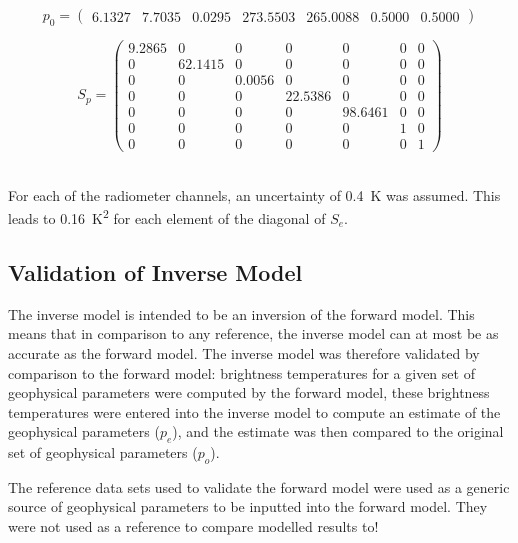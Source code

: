 \documentclass[11pt, a4paper]{article}
\begin{document}
\begin{equation*}
p_0 =
\begin{pmatrix}
   6.1327 & 7.7035 & 0.0295 & 273.5503 & 265.0088 & 0.5000 & 0.5000
\end{pmatrix}
\end{equation*}

\begin{equation*}
S_p =
\begin{pmatrix}
   9.2865 & 0 & 0 & 0 & 0 & 0 & 0 \\
   0 & 62.1415 & 0 & 0 & 0 & 0 & 0 \\
   0 & 0 & 0.0056 & 0 & 0 & 0 & 0 \\
   0 & 0 & 0 & 22.5386 & 0 & 0 & 0 \\
   0 & 0 & 0 & 0 & 98.6461 & 0 & 0 \\
   0 & 0 & 0 & 0 & 0 & 1 & 0 \\
   0 & 0 & 0 & 0 & 0 & 0 & 1
\end{pmatrix}
\end{equation*}

\ \\
For each of the radiometer channels, an uncertainty of \SI{0.4}{K} was assumed. This leads to \SI{0.16}{K^2} for each element of the diagonal of \(S_e\).






\subsection{Validation of Inverse Model}

The inverse model is intended to be an inversion of the forward model. This means that in comparison to any reference, the inverse model can at most be as accurate as the forward model. The inverse model was therefore validated by comparison to the forward model: brightness temperatures for a given set of geophysical parameters were computed by the forward model, these brightness temperatures were entered into the inverse model to compute an estimate of the geophysical parameters (\(p_e\)), and the estimate was then compared to the original set of geophysical parameters (\(p_o\)).
\newline

The reference data sets used to validate the forward model were used as a generic source of geophysical parameters to be inputted into the forward model. They were not used as a reference to compare modelled results to!
\newline
\end{document}
